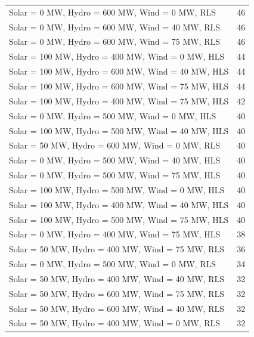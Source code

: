 \documentclass[10pt]{report}
\begin{document}
\begin{table}[H]
{\begin{tabular}{lr}
Solar = 0 MW, Hydro = 600 MW, Wind = 0 MW, RLS & 46 \\
Solar = 0 MW, Hydro = 600 MW, Wind = 40 MW, RLS & 46 \\
Solar = 0 MW, Hydro = 600 MW, Wind = 75 MW, RLS & 46 \\
Solar = 100 MW, Hydro = 400 MW, Wind = 0 MW, HLS & 44 \\
Solar = 100 MW, Hydro = 600 MW, Wind = 40 MW, HLS & 44 \\
Solar = 100 MW, Hydro = 600 MW, Wind = 75 MW, HLS & 44 \\
Solar = 100 MW, Hydro = 400 MW, Wind = 75 MW, HLS & 42 \\
Solar = 0 MW, Hydro = 500 MW, Wind = 0 MW, HLS & 40 \\
Solar = 100 MW, Hydro = 500 MW, Wind = 40 MW, HLS & 40 \\
Solar = 50 MW, Hydro = 600 MW, Wind = 0 MW, RLS & 40 \\
Solar = 0 MW, Hydro = 500 MW, Wind = 40 MW, HLS & 40 \\
Solar = 0 MW, Hydro = 500 MW, Wind = 75 MW, HLS & 40 \\
Solar = 100 MW, Hydro = 500 MW, Wind = 0 MW, HLS & 40 \\
Solar = 100 MW, Hydro = 400 MW, Wind = 40 MW, HLS & 40 \\
Solar = 100 MW, Hydro = 500 MW, Wind = 75 MW, HLS & 40 \\
Solar = 0 MW, Hydro = 400 MW, Wind = 75 MW, HLS & 38 \\
Solar = 50 MW, Hydro = 400 MW, Wind = 75 MW, RLS & 36 \\
Solar = 0 MW, Hydro = 500 MW, Wind = 0 MW, RLS & 34 \\
Solar = 50 MW, Hydro = 400 MW, Wind = 40 MW, RLS & 32 \\
Solar = 50 MW, Hydro = 600 MW, Wind = 75 MW, RLS & 32 \\
Solar = 50 MW, Hydro = 600 MW, Wind = 40 MW, RLS & 32 \\
Solar = 50 MW, Hydro = 400 MW, Wind = 0 MW, RLS & 32 \\

\bottomrule
\end{tabular}}
\end{table}
\end{document}
